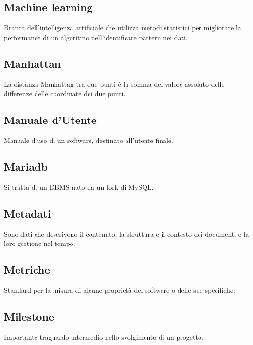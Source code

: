 \documentclass[../glossario.tex]{subfiles}
\begin{document}
\subsection*{Machine learning}
{}
Branca dell'intelligenza artificiale che utilizza metodi statistici per migliorare la performance di un algoritmo nell'identificare pattern nei dati.


\subsection*{Manhattan}
{}
La distanza Manhattan tra due punti è la somma del valore assoluto delle differenze delle coordinate dei due punti.

\subsection*{Manuale d'Utente}
{}
Manuale d'uso di un software, destinato all'utente finale.

\subsection*{Mariadb}
{}
Si tratta di un DBMS nato da un fork di MySQL.

\subsection*{Metadati}
{}
Sono dati che descrivono il contenuto, la struttura e il contesto dei documenti e la loro gestione nel tempo.


\subsection*{Metriche}
{}
Standard per la misura di alcune proprietà del software o delle sue specifiche.

\subsection*{Milestone}
{}
Importante traguardo intermedio nello svolgimento di un progetto.
\end{document}
